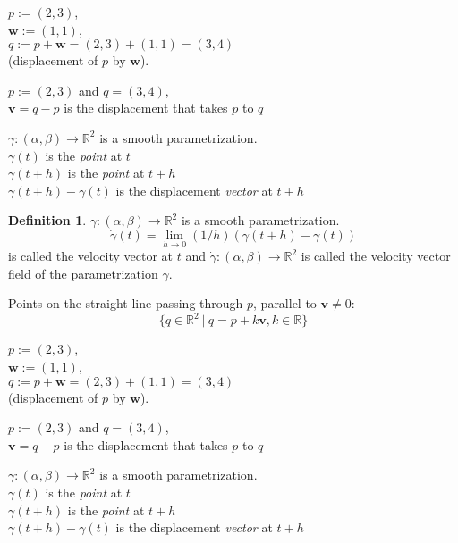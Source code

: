 \documentclass[twocolumn,20pt,fleqn]{extarticle}
\newcommand{\sep}{\vspace{0.5cm}}
\theoremstyle{plain}
\theoremstyle{definition}
\newtheorem*{definition}{Definition}
\theoremstyle{remark}
\begin{document}
\clearpage



$p := (2,3)$,\\ $\mathbf{w} := (1,1)$,\\ $q:=p + \mathbf{w} = (2,3) + (1,1) = (3,4)$ \\ (displacement of $p$ by $\mathbf{w}$).

\sep
$p := (2,3)$ and $q=(3,4)$,\\
$\mathbf{v}= q - p$ is the displacement that takes $p$ to $q$ 
\sep

$\gamma : (\alpha,\beta) \to \mathbb{R}^2$ is a smooth parametrization.\\
$\gamma(t)$ is the \emph{point} at $t$\\
$\gamma(t+h)$ is the \emph{point} at $t+h$\\
$\gamma(t+h)-\gamma(t)$ is the displacement \emph{vector} at $t+h$\\



\begin{definition}
$\gamma : (\alpha,\beta) \to \mathbb{R}^2$ is a smooth parametrization.
\[\dot{\gamma}(t) = \lim_{h\to 0} (1/h)(\gamma(t+h) - \gamma(t))\]
is called the velocity vector at $t$ and $\dot{\gamma} : (\alpha, \beta) \to \mathbb{R}^2$ is called the velocity vector field of the parametrization $\gamma$.
\end{definition}
\newpage
Points on the straight line passing through $p$, parallel to $\mathbf{v}\neq 0$:
\[\{q \in \mathbb{R}^2 \ |\ q = p  + k\mathbf{v} , k \in \mathbb{R}\}\]


\clearpage



$p := (2,3)$,\\ $\mathbf{w} := (1,1)$,\\ $q:=p + \mathbf{w} = (2,3) + (1,1) = (3,4)$ \\ (displacement of $p$ by $\mathbf{w}$).

\sep
$p := (2,3)$ and $q=(3,4)$,\\
$\mathbf{v}= q - p$ is the displacement that takes $p$ to $q$ 
\sep

$\gamma : (\alpha,\beta) \to \mathbb{R}^2$ is a smooth parametrization.\\
$\gamma(t)$ is the \emph{point} at $t$\\
$\gamma(t+h)$ is the \emph{point} at $t+h$\\
$\gamma(t+h)-\gamma(t)$ is the displacement \emph{vector} at $t+h$\\
\end{document}
